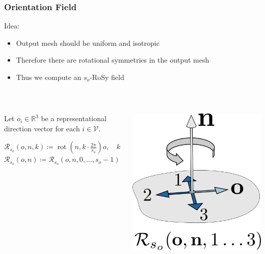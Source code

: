 \documentclass[aspectratio=43,sanserif,professionalfonts]{beamer}
\DeclareMathOperator{\rot}{rot}
\begin{document}
\begin{frame}
	\frametitle{Orientation Field}
	Idea:
	\begin{itemize}
		\item	Output mesh should be uniform and isotropic
		\item	Therefore there are rotational symmetries in the output mesh
		\item	Thus we compute an $s_o$-RoSy field
	\end{itemize}
	\pause
	~\\
	\begin{columns}
		\begin{column}{0.7\textwidth}
			Let $o_i \in \mathbb{R}^3$ be a representational direction vector for each $i \in \mathcal{V}$.\\

			\pause
			\begin{tcolorbox}[colback=green!5,colframe=green!40!black,title=Symmetry Group - Integer Rotations]
				$\mathcal{R}_{s_o}(o,n,k) \coloneqq \rot \left(n, k \cdot \frac{2\pi}{s_o} \right) o, \quad k \in \mathbb{Z}$ \\
				$\mathcal{R}_{s_o}(o,n) \coloneqq \mathcal{R}_{s_o}(o,n,0, \dots, s_o-1)$
			\end{tcolorbox}
		\end{column}
		\begin{column}{0.2\textwidth}
			\centering
			\includegraphics[width=\textwidth]{img/integer-rotation.png}
		\end{column}
	\end{columns}
\end{frame}
\end{document}
